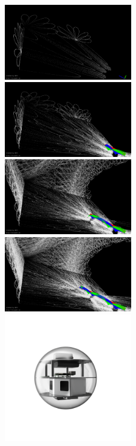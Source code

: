 \begin{figure}
	\centering
	\includegraphics[width=0.495\textwidth]{images/sim_frame_00.png}\hfill
	\includegraphics[width=0.495\textwidth]{images/sim_frame_02.png}\\
	\includegraphics[width=0.495\textwidth]{images/sim_frame_06.png}\hfill
	\includegraphics[width=0.495\textwidth]{images/sim_frame_08.png}\\
	\includegraphics[width=0.495\textwidth]{images/ProtoRoll1.png}\hfill

\end{figure}
